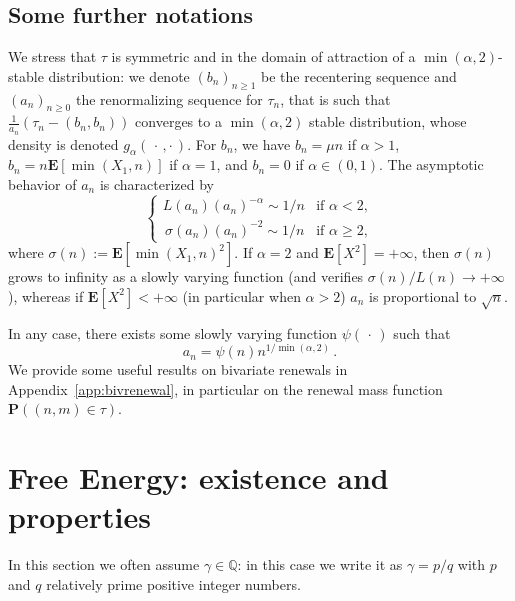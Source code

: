 \documentclass[11pt]{article}
\theoremstyle{definition}
\numberwithin{equation}{section}
\numberwithin{figure}{section}
\numberwithin{table}{section}
\newcommand{\ga}{\alpha}
\newcommand{\bP}{\ensuremath{\mathbf{P}}}
\newcommand{\bE}{\ensuremath{\mathbf{E}}}
\newcommand{\bbQ}{\ensuremath{\mathbb{Q}}}
\begin{document}
\subsection{Some further notations}\label{sec:defan}

We stress that $\tau$ is symmetric and in the domain of attraction of a $\min(\ga,2)$-stable distribution: we denote $(b_n)_{n\geq 1}$ be the recentering sequence and ${(a_n)}_{n \ge 0}$ the renormalizing sequence for $\tau_n$, that is such that $\tfrac{1}{a_n} (\tau_n - (b_n,b_n))$ converges to a $\min(\ga,2)$ stable distribution, whose density is denoted $g_\ga({\,\cdot\,,\cdot\,})$. For $b_n$, we have $b_n=\mu n$ if $\ga>1$, $b_n= n\bE[\min(X_1, n)]$ if $\ga=1$, and $b_n=0$ if $\ga \in(0,1)$. The asymptotic behavior of $a_n$ is characterized by
\begin{equation}\label{def:an}
\begin{cases}
L(a_n) (a_n)^{-\ga} \sim 1/n &\text{if } \ga<2,\\
\,\sigma(a_n) (a_n)^{-2} \sim 1/n &\text{if } \ga\geq 2,
\end{cases}
\end{equation}
where $\sigma(n):=\bE[\min(X_1, n)^2]$. If $\ga = 2$ and $\bE[X^2]=+\infty$, then $\sigma(n)$ grows to infinity as a slowly varying function (and verifies $\sigma(n)/L(n) \to +\infty$), whereas if $\bE[X^2]<+\infty$ (in particular when $\ga>2$) $a_n$ is proportional to $\sqrt{n}$.

In any case, there exists some slowly varying function $\psi({\,\cdot\,})$ such that
\begin{equation}
a_n = \psi(n) n^{1/\min(\ga, 2)}\,.\label{an}
\end{equation}
We provide some useful results on bivariate renewals in Appendix~\ref{app:bivrenewal}, in particular on the renewal mass function $\bP((n,m)\in\tau)$.


\section{Free Energy: existence and properties}\label{sec:existence}

In this section we often assume $\gamma\in \bbQ$: in this case we write it as $\gamma=p/q$ with $p$ and $q$ relatively prime positive integer numbers.
\end{document}
